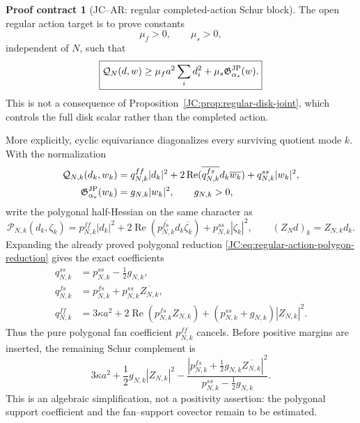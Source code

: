 \documentclass[11pt]{amsart}
\numberwithin{equation}{section}
\theoremstyle{definition}
\newtheorem{contract}[theorem]{Proof contract}
\theoremstyle{remark}
\newcommand{\Gjp}{\mathfrak G^{\rm JP}}
\begin{document}
\begin{contract}[JC--AR: regular completed-action Schur block]
The open regular action target is to prove constants
\begin{equation}\label{JC:eq:regular-action-constants}
 \mu_f>0,\qquad \mu_s>0,
\end{equation}
independent of $N$, such that
\begin{equation}\label{JC:eq:regular-action-Schur}
 \boxed{
 \mathcal Q_N(d,w)
 \ge \mu_fa^2\sum_i d_i^2+
      \mu_s\Gjp_{\alpha_*}(w).}
\end{equation}
This is not a consequence of Proposition~\ref{JC:prop:regular-disk-joint},
which controls the full disk scalar rather than the completed action.

More explicitly, cyclic equivariance diagonalizes every surviving quotient
mode $k$.  With the normalization
\begin{align*}
 \mathcal Q_{N,k}(d_k,w_k)
 &=q^{ff}_{N,k}|d_k|^2
   +2\operatorname {Re}(\overline{q^{fs}_{N,k}}d_k\overline{w_k})
   +q^{ss}_{N,k}|w_k|^2,\\
 \Gjp_{\alpha_*}(w_k)&=g_{N,k}|w_k|^2,
 \qquad g_{N,k}>0,
\end{align*}
write the polygonal half-Hessian on the same character as
\[
 \mathcal P_{N,k}(d_k,\zeta_k)
 =p^{ff}_{N,k}|d_k|^2
  +2\operatorname {Re}
    (\overline{p^{fs}_{N,k}}d_k\overline{\zeta_k})
  +p^{ss}_{N,k}|\zeta_k|^2,
 \qquad (Z_Nd)_k=Z_{N,k}d_k.
\]
Expanding the already proved polygonal reduction
\eqref{JC:eq:regular-action-polygon-reduction} gives the exact coefficients
\begin{equation}\label{JC:eq:regular-action-polygon-mode-coefficients}
 \boxed{
 \begin{aligned}
 q^{ss}_{N,k}&=p^{ss}_{N,k}-\frac12g_{N,k},\\
 q^{fs}_{N,k}&=p^{fs}_{N,k}+p^{ss}_{N,k}\overline{Z_{N,k}},\\
 q^{ff}_{N,k}&=3\kappa a^2
 {}+2\operatorname {Re}(p^{fs}_{N,k}Z_{N,k})
 +(p^{ss}_{N,k}+g_{N,k})|Z_{N,k}|^2.
 \end{aligned}}
\end{equation}
Thus the pure polygonal fan coefficient $p^{ff}_{N,k}$ cancels.  Before
positive margins are inserted, the remaining Schur complement is
\[
 3\kappa a^2+\frac12g_{N,k}|Z_{N,k}|^2
 -\frac{|p^{fs}_{N,k}+\frac12g_{N,k}\overline{Z_{N,k}}|^2}
 {p^{ss}_{N,k}-\frac12g_{N,k}}.
\]
This is an algebraic simplification, not a positivity assertion: the
polygonal support coefficient and the fan--support covector remain to be
estimated.


\end{contract}
\end{document}
